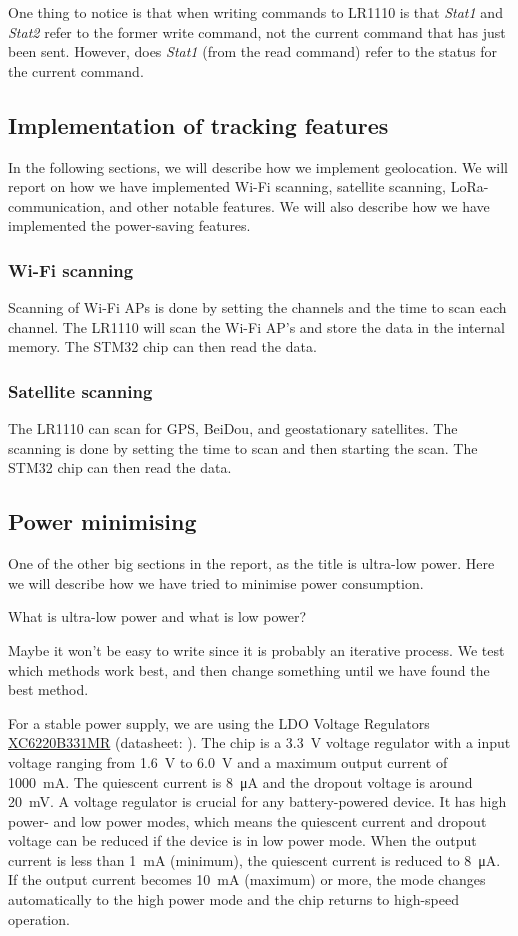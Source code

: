 One thing to notice is that when writing commands to LR1110 is that \textit{Stat1} and \textit{Stat2} refer to the former write command, not the current command that has just been sent. However, does \textit{Stat1} (from the read command) refer to the status for the current command.

\subsection{Implementation of tracking features}
In the following sections, we will describe how we implement geolocation. We will report on how we have implemented Wi-Fi scanning, satellite scanning, \ac{LoRa}-communication, and other notable features. We will also describe how we have implemented the power-saving features.

\subsubsection{Wi-Fi scanning}
Scanning of Wi-Fi \ac{AP}s is done by setting the channels and the time to scan each channel. The LR1110 will scan the Wi-Fi \ac{AP}'s and store the data in the internal memory. The STM32 chip can then read the data.

\subsubsection{Satellite scanning}
The LR1110 can scan for \ac{GPS}, BeiDou, and geostationary satellites. The scanning is done by setting the time to scan and then starting the scan. The STM32 chip can then read the data.

\subsection{Power minimising}
One of the other big sections in the report, as the title is ultra-low power. Here we will describe how we have tried to minimise power consumption.

What is ultra-low power and what is low power?

Maybe it won't be easy to write since it is probably an iterative process. We test which methods work best, and then change something until we have found the best method.


For a stable power supply, we are using the \ac{LDO} Voltage Regulators \hyperref[bom:xc6220]{XC6220B331MR} (datasheet: ). The chip is a \SI{3.3}{\volt} voltage regulator with a input voltage ranging from \SI{1.6}{\volt} to \SI{6.0}{\volt} and a maximum output current of \SI{1000}{\milli\ampere}. The quiescent current is \SI{8}{\micro\ampere} and the dropout voltage is around \SI{20}{\milli\volt}. A voltage regulator is crucial for any battery-powered device. It has high power- and low power modes, which means the quiescent current and dropout voltage can be reduced if the device is in low power mode. When the output current is less than \SI{1}{\milli\ampere} (minimum), the quiescent current is reduced to \SI{8}{\micro\ampere}. If the output current becomes \SI{10}{\milli\ampere} (maximum) or more, the mode changes automatically to the high power mode and the chip returns to high-speed operation.

